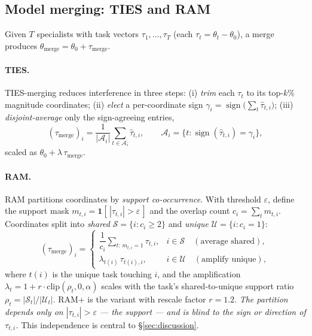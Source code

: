 \documentclass[11pt]{article}
\newcommand{\tv}{\tau}                      %
\newcommand{\base}{\theta_{0}}
\newcommand{\indic}{\mathbf{1}}
\begin{document}
\subsection{Model merging: TIES and RAM}
\label{sec:prelim-merge}
Given $T$ specialists with task vectors $\tv_1,\dots,\tv_T$ (each $\tv_t=\theta_t-\base$),
a merge produces $\theta_{\text{merge}}=\base+\tv_{\text{merge}}$.

\paragraph{TIES.} TIES-merging \citep{yadav2023ties} reduces interference in three steps:
(i) \emph{trim} each $\tv_t$ to its top-$k\%$ magnitude coordinates; (ii) \emph{elect} a
per-coordinate sign $\gamma_i=\operatorname{sign}\!\big(\sum_t \hat\tv_{t,i}\big)$;
(iii) \emph{disjoint-average} only the sign-agreeing entries,
\begin{equation}
(\tv_{\text{merge}})_i=\frac{1}{|\mathcal{A}_i|}\sum_{t\in\mathcal{A}_i}\hat\tv_{t,i},
\qquad \mathcal{A}_i=\{t:\operatorname{sign}(\hat\tv_{t,i})=\gamma_i\},
\end{equation}
scaled as $\base+\lambda\,\tv_{\text{merge}}$.

\paragraph{RAM.} RAM \citep{ram2026} partitions coordinates by \emph{support
co-occurrence}. With threshold $\varepsilon$, define the support mask
$m_{t,i}=\indic[\,|\tv_{t,i}|>\varepsilon\,]$ and the overlap count
$c_i=\sum_{t}m_{t,i}$. Coordinates split into \emph{shared} $\mathcal{S}=\{i:c_i\ge2\}$
and \emph{unique} $\mathcal{U}=\{i:c_i=1\}$:
\begin{equation}
(\tv_{\text{merge}})_i=
\begin{cases}
\dfrac{1}{c_i}\displaystyle\sum_{t:\,m_{t,i}=1}\tv_{t,i}, & i\in\mathcal{S}\quad(\text{average shared}),\\[1.2em]
\lambda_{t(i)}\,\tv_{t(i),i}, & i\in\mathcal{U}\quad(\text{amplify unique}),
\end{cases}
\end{equation}
where $t(i)$ is the unique task touching $i$, and the amplification
$\lambda_t=1+r\cdot\mathrm{clip}(\rho_t,0,\alpha)$ scales with the task's shared-to-unique
support ratio $\rho_t=|\mathcal{S}_t|/|\mathcal{U}_t|$. RAM+ is the variant with rescale
factor $r{=}1.2$. \emph{The partition depends only on $|\tv_{t,i}|>\varepsilon$ --- the
support --- and is blind to the sign or direction of $\tv_{t,i}$.} This independence is
central to \S\ref{sec:discussion}.
\end{document}
